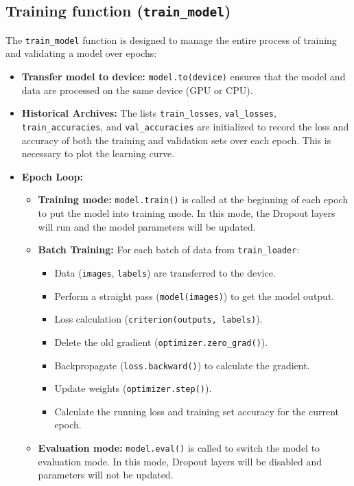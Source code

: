 \documentclass[12pt]{article}
\begin{document}
\subsection{Training function (\texttt{train\_model})}
The \texttt{train\_model} function is designed to manage the entire process of training and validating a model over epochs:
\begin{itemize}
    \item \textbf{Transfer model to device:} \texttt{model.to(device)} ensures that the model and data are processed on the same device (GPU or CPU).
    \item \textbf{Historical Archives:} The lists \texttt{train\_losses}, \texttt{val\_losses}, \texttt{train\_accuracies}, and \texttt{val\_accuracies} are initialized to record the loss and accuracy of both the training and validation sets over each epoch. This is necessary to plot the learning curve.
    \item \textbf{Epoch Loop:}
    \begin{itemize}
        \item \textbf{Training mode:} \texttt{model.train()} is called at the beginning of each epoch to put the model into training mode. In this mode, the Dropout layers will run and the model parameters will be updated.
        \item \textbf{Batch Training:} For each batch of data from \texttt{train\_loader}:
        \begin{itemize}
            \item Data (\texttt{images}, \texttt{labels}) are transferred to the device.
            \item Perform a straight pass (\texttt{model(images)}) to get the model output.
            \item Loss calculation (\texttt{criterion(outputs, labels)}).
            \item Delete the old gradient (\texttt{optimizer.zero\_grad()}).
            \item Backpropagate (\texttt{loss.backward()}) to calculate the gradient.
            \item Update weights (\texttt{optimizer.step()}).
            \item Calculate the running loss and training set accuracy for the current epoch.
        \end{itemize}
        \item \textbf{Evaluation mode:} \texttt{model.eval()} is called to switch the model to evaluation mode. In this mode, Dropout layers will be disabled and parameters will not be updated.

\end{itemize}
\end{itemize}
\end{document}
